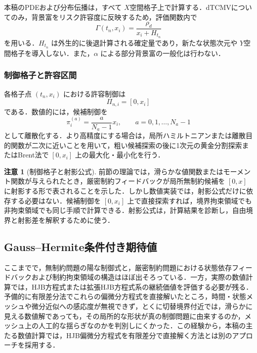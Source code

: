 \documentclass[10pt,a4paper]{article}
\theoremstyle{plain}
\theoremstyle{definition}
\newtheorem{remark}{注意}
\begin{document}
本稿のPDEおよび分布伝播は，すべて $X$空間格子上で計算する．dTCMVについてのみ，背景富をリスク許容度に反映するため，評価関数内で
\begin{equation}
  \Gamma(t_n,x_i)=\frac{\rho_d}{x_i+H_{t_n}}
  \label{eq:gamma-grid}
\end{equation}
を用いる．$H_{t_n}$ は外生的に後退計算される確定量であり，新たな状態次元や $Y$空間格子を導入しない．また，$\alpha$ による部分背景富の一般化は行わない．

\subsubsection{制御格子と許容区間}

各格子点 $(t_n,x_i)$ における許容制御は
\begin{equation}
  \Pi_{n,i}=[0,x_i]
  \label{eq:control-interval}
\end{equation}
である．数値的には，候補制御を
\begin{equation}
  \pi_i^{(a)}=\frac{a}{N_a-1}x_i,
  \qquad a=0,1,\ldots,N_a-1
  \label{eq:control-grid}
\end{equation}
として離散化する．より高精度にする場合は，局所ハミルトニアンまたは離散目的関数が二次に近いことを用いて，粗い候補探索の後に1次元の黄金分割探索またはBrent法で $[0,x_i]$ 上の最大化・最小化を行う．

\begin{remark}[制御格子と射影公式]
前節の理論では，滑らかな値関数またはモーメント関数が与えられたとき，厳密制約フィードバックが局所無制約候補を $[0,x]$ に射影する形で表されることを示した．しかし数値実装では，射影公式だけに依存する必要はない．候補制御を $[0,x_i]$ 上で直接探索すれば，境界拘束領域でも非拘束領域でも同じ手順で計算できる．射影公式は，計算結果を診断し，自由境界と射影差を解釈するために使う．
\end{remark}

\subsection{Gauss--Hermite条件付き期待値}
\label{sec:gh}

ここまでで，無制約問題の陽な制御式と，厳密制約問題における状態依存フィードバックおよび制約拘束領域の構造はほぼ出そろっている．一方，実際の数値計算では，HJB方程式または拡張HJB方程式系の継続価値を評価する必要が残る．予備的に有限差分法でこれらの偏微分方程式を直接解いたところ，時間・状態メッシュや微分近似への感応度が無視できず，とくに切替境界付近では，滑らかに見える数値解であっても，その局所的な形状が真の制御問題に由来するのか，メッシュ上の人工的な揺らぎなのかを判別しにくかった．この経験から，本稿の主たる数値計算では，HJB偏微分方程式を有限差分で直接解く方法とは別のアプローチを採用する．
\end{document}
